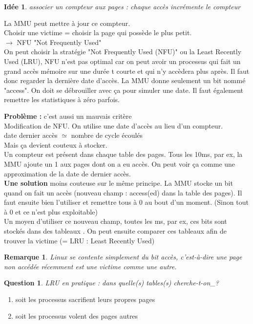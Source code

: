 \documentclass[12pt,a4paper]{report}
\newtheorem*{rem}{Remarque}
\newtheorem*{q}{Question}
\newtheorem*{id}{Idée}
\begin{document}
\begin{id}associer un compteur aux pages : chaque accès incrémente le compteur\end{id}
La MMU peut mettre à jour ce compteur.\\
Choisir une victime = choisir la page qui possède le plus petit.\\
$\rightarrow$ NFU "Not Frequently Used" \\
On peut choisir la stratégie "Not Frequently Used (NFU)" ou la Least Recently Used (LRU),
NFU n'est pas optimal car on peut avoir un processus qui fait un grand accès mémoire sur une durée t courte et qui n'y accèdera plus après.
Il faut donc regarder la dernière date d'accès.
La MMU donne seulement un bit nommé "access". On doit se débrouiller avec ça pour simuler une date. Il faut également remettre les statistiques à zéro parfois.

\textbf{Problème :} c'est aussi un mauvais critère\\

Modification de NFU. On utilise une date d'accès au lieu d'un compteur.\\
date dernier accès $\simeq$ nombre de cycle écoulés\\
Mais ça devient couteux à stocker.\\
Un compteur est présent dans chaque table des pages. Tous les 10ms, par ex, la MMU ajoute un 1 aux pages dont on a eu accès. On peut voir ça comme une approximation de la date de dernier accès.\\

\textbf{Une solution} moins couteuse sur le même principe. La MMU stocke un bit quand on fait un accès (nouveau champ : access(ed) dans la table des pages). Il faut ensuite bien l'utiliser et remettre tous à 0 au bout d'un moment. (Sinon tout à 0 et ce n'est plus exploitable)\\
Un moyen d'utiliser ce nouveau champ, toutes les ms, par ex, ces bits sont stockés dans des tableaux .
On peut ensuite comparer ces tableaux afin de trouver la victime (= LRU : Least Recently Used)\\

\begin{rem}Linux se contente simplement du bit accès, c'est-à-dire une page non accédée récemment est une victime comme une autre.\end{rem}

\begin{q}LRU en pratique : dans quelle(s) tables(s) cherche-t-on_?\end{q}
\begin{enumerate}
\item soit les processus sacrifient leurs propres pages
\item soit les processus volent des pages autres
\end{enumerate}
\end{document}
